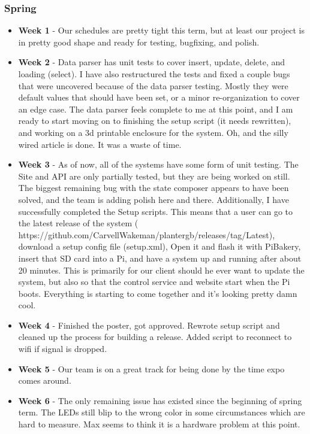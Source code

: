 \documentclass[onecolumn, draftclsnofoot,10pt, compsoc]{IEEEtran}
\begin{document}
			\subsubsection{Spring}
				\begin{itemize}
					\item \textbf{Week 1} - Our schedules are pretty tight this term, but at least our project is in pretty good shape and ready for testing, bugfixing, and polish. 
					\item \textbf{Week 2} - Data parser has unit tests to cover insert, update, delete, and loading (select). I have also restructured the tests and fixed a couple bugs that were uncovered because of the data parser testing. Mostly they were default values that should have been set, or a minor re-organization to cover an edge case. The data parser feels complete to me at this point, and I am ready to start moving on to finishing the setup script (it needs rewritten), and working on a 3d printable enclosure for the system. Oh, and the silly wired article is done. It was a waste of time. 
					\item \textbf{Week 3} - As of now, all of the systems have some form of unit testing. The Site and API are only partially tested, but they are being worked on still. The biggest remaining bug with the state composer appears to have been solved, and the team is adding polish here and there. Additionally, I have successfully completed the Setup scripts. This means that a user can go to the latest release of the system ( https://github.com/CarvellWakeman/plantergb/releases/tag/Latest), download a setup config file (setup.xml), Open it and flash it with PiBakery, insert that SD card into a Pi, and have a system up and running after about 20 minutes. This is primarily for our client should he ever want to update the system, but also so that the control service and website start when the Pi boots. Everything is starting to come together and it's looking pretty damn cool. 
					\item \textbf{Week 4} - Finished the poster, got approved. Rewrote setup script and cleaned up the process for building a release. Added script to reconnect to wifi if signal is dropped. 
					\item \textbf{Week 5} - Our team is on a great track for being done by the time expo comes around. 
					\item \textbf{Week 6} - The only remaining issue has existed since the beginning of spring term. The LEDs still blip to the wrong color in some circumstances which are hard to measure. Max seems to think it is a hardware problem at this point. 

\end{itemize}
\end{document}
